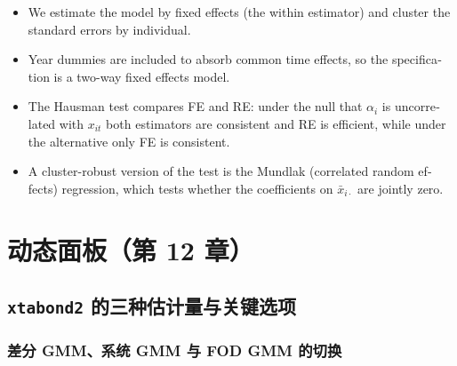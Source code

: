 \begin{english}
\begin{itemize}
  \item We estimate the model by fixed effects (the within estimator) and cluster the standard errors by individual.
  \item Year dummies are included to absorb common time effects, so the specification is a two-way fixed effects model.
  \item The Hausman test compares FE and RE: under the null that $\alpha_i$ is uncorrelated with $x_{it}$ both estimators are consistent and RE is efficient, while under the alternative only FE is consistent.
  \item A cluster-robust version of the test is the Mundlak (correlated random effects) regression, which tests whether the coefficients on $\bar x_{i\cdot}$ are jointly zero.
\end{itemize}
\end{english}

\section{动态面板（第 12 章）}\label{sec:UappB-dynamic}

\subsection{\texttt{xtabond2} 的三种估计量与关键选项}

\subsubsection{差分 GMM、系统 GMM 与 FOD GMM 的切换}

